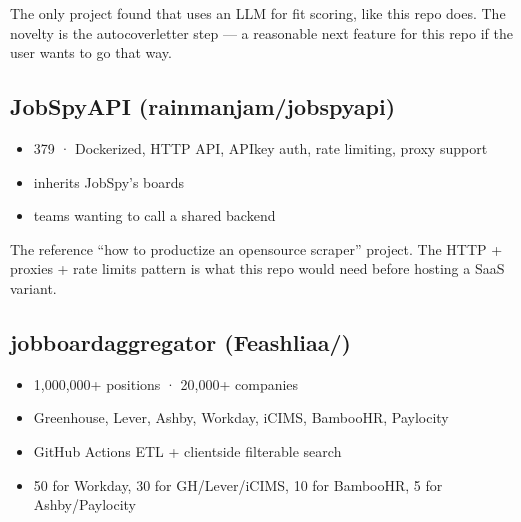 \documentclass[a4paper,11pt,english]{sphinxmanual}
\begin{document}
\sphinxAtStartPar
{} The only project found that uses an LLM for fit scoring,
like this repo does. The novelty is the auto\sphinxhyphen{}cover\sphinxhyphen{}letter step — a
reasonable next feature for this repo if the user wants to go that way.


\subsection{JobSpy\sphinxhyphen{}API (rainmanjam/jobspy\sphinxhyphen{}api)}
\label{\detokenize{analysis:jobspy-api-rainmanjam-jobspy-api}}\begin{itemize}
\item {} 
\sphinxAtStartPar
{} 379 ·  Dockerized, HTTP API, API\sphinxhyphen{}key auth,
rate limiting, proxy support

\item {} 
\sphinxAtStartPar
{} inherits JobSpy’s boards

\item {} 
\sphinxAtStartPar
{} teams wanting to call a shared backend

\end{itemize}

\sphinxAtStartPar
{} The reference “how to productize an open\sphinxhyphen{}source scraper”
project. The HTTP + proxies + rate limits pattern is what this repo
would need before hosting a SaaS variant.


\subsection{job\sphinxhyphen{}board\sphinxhyphen{}aggregator (Feashliaa/)}
\label{\detokenize{analysis:job-board-aggregator-feashliaa}}\begin{itemize}
\item {} 
\sphinxAtStartPar
{} 1,000,000+ positions · 20,000+ companies

\item {} 
\sphinxAtStartPar
{} Greenhouse, Lever, Ashby, Workday, iCIMS, BambooHR,
Paylocity

\item {} 
\sphinxAtStartPar
{} GitHub Actions ETL + client\sphinxhyphen{}side filterable search

\item {} 
\sphinxAtStartPar
{} 50 for Workday, 30 for GH/Lever/iCIMS,
10 for BambooHR, 5 for Ashby/Paylocity

\end{itemize}
\end{document}
